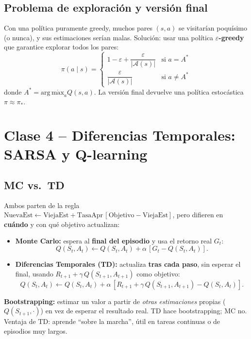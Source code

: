 \documentclass[11pt, a4paper]{article}
\newcommand{\argmax}{\operatorname*{arg\,m\acute{a}x}}
\begin{document}
\subsection{Problema de exploraci\'on y versi\'on final}
Con una pol\'itica puramente greedy, muchos pares $(s,a)$ se visitar\'ian poqu\'isimo (o nunca), y sus estimaciones ser\'ian malas. Soluci\'on: usar una pol\'itica \textbf{$\varepsilon$-greedy} que garantice explorar todos los pares:
\[
    \pi(a \mid s) =
    \begin{cases}
        1 - \varepsilon + \dfrac{\varepsilon}{|\mathcal{A}(s)|} & \text{si } a = A^* \\[2mm]
        \dfrac{\varepsilon}{|\mathcal{A}(s)|} & \text{si } a \neq A^*
    \end{cases}
\]
donde $A^* = \argmax_a Q(s, a)$. La versi\'on final devuelve una pol\'itica estoc\'astica $\pi \approx \pi_*$.

\section{Clase 4 -- Diferencias Temporales: SARSA y Q-learning}

\subsection{MC vs.\ TD}
Ambos parten de la regla $\text{NuevaEst} \leftarrow \text{ViejaEst} + \text{TasaApr}\,[\text{Objetivo} - \text{ViejaEst}]$, pero difieren en \textbf{cu\'ando} y con qu\'e objetivo actualizan:
\begin{itemize}[nosep]
    \item \textbf{Monte Carlo:} espera al \textbf{final del episodio} y usa el retorno real $G_t$:
    \[
        Q(S_t, A_t) \leftarrow Q(S_t, A_t) + \alpha\,[G_t - Q(S_t, A_t)].
    \]
    \item \textbf{Diferencias Temporales (TD):} actualiza \textbf{tras cada paso}, sin esperar el final, usando $R_{t+1} + \gamma\, Q(S_{t+1}, A_{t+1})$ como objetivo:
    \[
        Q(S_t, A_t) \leftarrow Q(S_t, A_t) + \alpha\,[R_{t+1} + \gamma\, Q(S_{t+1}, A_{t+1}) - Q(S_t, A_t)].
    \]
\end{itemize}
\textbf{Bootstrapping:} estimar un valor a partir de \emph{otras estimaciones} propias ($Q(S_{t+1}, \cdot)$) en vez de esperar el resultado real. TD hace bootstrapping; MC no. Ventaja de TD: aprende ``sobre la marcha'', \'util en tareas continuas o de episodios muy largos.
\end{document}
